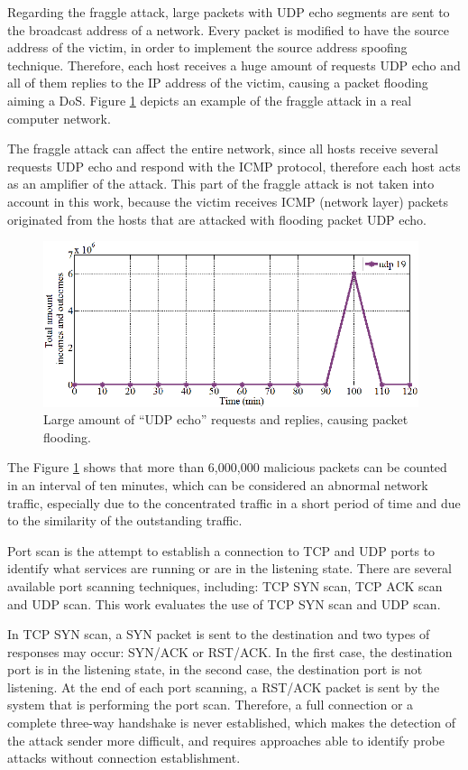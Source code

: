 Regarding the fraggle attack, large packets with UDP echo segments are sent to the broadcast address of a network. Every packet is modified to have the source address of the victim, in order to implement the source address spoofing technique. Therefore, each host receives a huge amount of requests UDP echo and all of them replies to the IP address of the victim, causing a packet flooding aiming a DoS. Figure \ref{fig:2.06} depicts an example of the fraggle attack in a real computer network. 

The fraggle attack can affect the entire network, since all hosts receive several requests UDP echo and respond with the ICMP protocol, therefore each host acts as an amplifier of the attack. This part of the fraggle attack is not taken into account in this work, because the victim receives ICMP (network layer) packets originated from the hosts that are attacked with flooding packet UDP echo.

\begin{figure}[h!]
     \centering 
     \includegraphics[width=11cm]{figs/ch2/fig06.png}
     \caption{Large amount of “UDP echo” requests and replies, causing packet flooding.}
     \label{fig:2.06}
\end{figure}

The Figure \ref{fig:2.06} shows that more than 6,000,000 malicious packets can be counted in an interval of ten minutes, which can be considered an abnormal network traffic, especially due to the concentrated traffic in a short period of time and due to the similarity of the outstanding traffic.

Port scan is the attempt to establish a connection to TCP and UDP ports to identify what services are running or are in the listening state. There are several available port scanning techniques, including: TCP SYN scan, TCP ACK scan and UDP scan. This work evaluates the use of TCP SYN scan and UDP scan. 

In TCP SYN scan, a SYN packet is sent to the destination and two types of responses may occur: SYN/ACK or RST/ACK. In the first case, the destination port is in the listening state, in the second case, the destination port is not listening. At the end of each port scanning, a RST/ACK packet is sent by the system that is performing the port scan. Therefore, a full connection or a complete three-way handshake is never established, which makes the detection of the attack sender more difficult, and requires approaches able to identify probe attacks without connection establishment.

